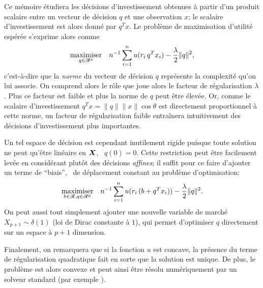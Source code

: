 Ce mémoire étudiera les décisions d'investissement obtenues à partir d'un produit scalaire
entre un vecteur de décision $q$ et une observation $x$; le scalaire d'investissement est
alors donné par $q^Tx$. Le problème de maximisation d'utilité espérée s'exprime alors
comme
\begin{equation}
  \label{intro:he}
  \maximizeEquation[q \in \Re^p]{n^{-1}\sumi u(r_i\,q^Tx_i) - \frac{\lambda}{2}\|q\|^2,}
\end{equation}
c'est-à-dire que la \textit{norme} du vecteur de décision $q$ représente la complexité
qu'on lui associe. On comprend alors le rôle que joue alors le facteur de régularisation
$\lambda$. Plus ce facteur est faible et plus la norme de $q$ peut être élevée. Or, comme le
scalaire d'investissement $q^Tx = \|q\|\|x\|\cos\theta$ est directement proportionnel à cette
norme, un facteur de régularisation faible entraînera intuitivement des décisions
d'investissement plus importantes.

Un tel espace de décision est cependant inutilement rigide puisque toute solution ne peut
qu'être linéaire en $\X$, \ie\ $q(0) = 0$. Cette restriction peut être facilement levée en
considérant plutôt des décisions \textit{affines}; il suffit pour ce faire d'ajouter un
terme de ``biais'', \ie\ de déplacement constant au problème d'optimisation:
\begin{equation}
  \maximizeEquation[b \in \Re, q \in \Re^p]{n^{-1}\sumi u(r_i\,(b + q^Tx_i)) - \frac{\lambda}{2}\|q\|^2.}
\end{equation}
On peut aussi tout simplement ajouter une nouvelle variable de marché
$X_{p+1} \sim \delta(1)$ (loi de Dirac constante à $1$), qui permet d'optimiser $q$ directement
sur un espace à $p+1$ dimension.

Finalement, on remarquera que si la fonction $u$ est concave, la présence du terme de
régularisation quadratique fait en sorte que la solution est unique. De plus, le problème
est alors convexe et peut ainsi être résolu numériquement par un solveur standard (par
exemple \cite{cvx,gb08}).

